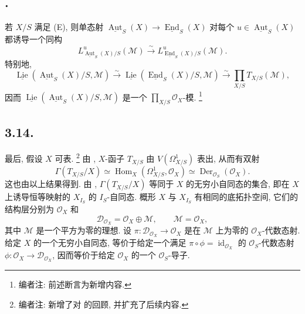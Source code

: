 \subsection*{.}
若 \(X/S\) 满足 (E), 则单态射
\(\underline{\operatorname{Aut}}_S(X)\to
\underline{\operatorname{End}}_S(X)\) 对每个
\(u\in\underline{\operatorname{Aut}}_S(X)\) 都诱导一个同构
\[
  L^u_{\underline{\operatorname{Aut}}_S(X)/S}(\mathcal M)
  \xrightarrow{\sim}
  L^u_{\underline{\operatorname{End}}_S(X)/S}(\mathcal M).
\]
特别地,
\[
  \underline{\operatorname{Lie}}
    (\underline{\operatorname{Aut}}_S(X)/S,\mathcal M)
  \xrightarrow{\sim}
  \underline{\operatorname{Lie}}
    (\underline{\operatorname{End}}_S(X)/S,\mathcal M)
  \xrightarrow{\sim}
  \prod_{X/S}T_{X/S}(\mathcal M),
\]
因而
\(\underline{\operatorname{Lie}}
  (\underline{\operatorname{Aut}}_S(X)/S,\mathcal M)\)
是一个 \(\prod_{X/S}\mathcal O_X\)-模.
\footnote{编者注: 前述断言为新增内容.}

\subsection*{3.14.}
最后, 假设 \(X\) 可表.
\footnote{编者注: 新增了对  的回顾,
并扩充了后续内容.}
由 ,
\(X\)-函子 \(T_{X/S}\) 由 \(V(\Omega^1_{X/S})\) 表出,
从而有双射
\[
  \Gamma(T_{X/S}/X)
  \simeq\operatorname{Hom}_X(\Omega^1_{X/S},\mathcal O_X)
  \simeq\operatorname{Der}_{\mathcal O_S}(\mathcal O_X).
\]
这也由以上结果得到. 由 ,
\(\Gamma(T_{X/S}/X)\) 等同于 \(X\) 的无穷小自同态的集合,
即在 \(X\) 上诱导恒等映射的 \(X_{I_S}\) 的 \(I_S\)-自同态.
概形 \(X\) 与 \(X_{I_S}\) 有相同的底拓扑空间,
它们的结构层分别为 \(\mathcal O_X\) 和
\[
  \mathscr D_{\mathcal O_X}=\mathcal O_X\oplus\mathcal M,
  \qquad \mathcal M=\mathcal O_X,
\]
其中 \(\mathcal M\) 是一个平方为零的理想.
设 \(\pi:\mathscr D_{\mathcal O_X}\to\mathcal O_X\)
是在 \(\mathcal M\) 上为零的 \(\mathcal O_X\)-代数态射.
给定 \(X\) 的一个无穷小自同态,
等价于给定一个满足 \(\pi\circ\phi=\operatorname{id}_{\mathcal O_X}\)
的 \(\mathcal O_S\)-代数态射
\(\phi:\mathcal O_X\to\mathscr D_{\mathcal O_X}\),
因而等价于给定 \(\mathcal O_X\) 的一个 \(\mathcal O_S\)-导子.

